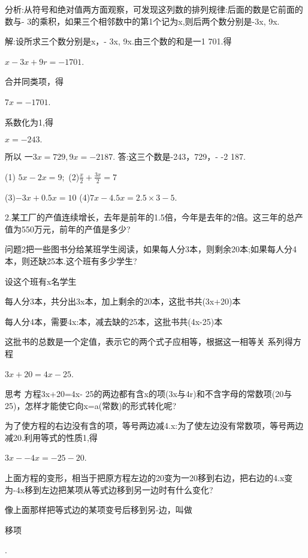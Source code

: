 \documentclass{article}
\begin{document}
\begin{article}
\begin{example}
      分析:从符号和绝对值两方面观察，可发现这列数的排列规律:后面的数是它前面的数与- 3的乘积，如果三个相邻数中的第1个记为x,则后两个数分别是-3x, 9x.      
      
      解:设所求三个数分别是x，- 3x, 9x.由三个数的和是一1 701.得 
      
      $x-3x+9r=-1701$. 
      
      合并同类项，得 
      
      $7x=-1 701$. 
      
      系数化为1,得
      
      $x=-243.$      
      
      所以      
      $一3x=729,9x=-2187$.      
      答:这三个数是-243，729，- -2 187.
      \end{example}
      
      \begin{exercise}
      (1) $5x-2x=9;$  (2)$\frac{x}{2}+\frac{3x}{2}=7$
      
      (3)$-3x+0.5x=10$ (4)$7x-4.5x=2.5\times3-5$.
      
      2.某工厂的产值连续增长，去年是前年的1.5倍，今年是去年的2倍。这三年的总产值为550万元，前年的产值是多少?
      \end{exercise}
      
      \begin{example}
      问题2把一些图书分给某班学生阅读，如果每人分3本，则剩余20本;如果每人分4本，则还缺25本.这个班有多少学生?
      
      设这个班有x名学生
      
      每人分3本，共分出3x本，加上剩余的20本，这批书共(3x+20)本
      
      每人分4本，需要4x:本，减去缺的25本，这批书共(4x-25)本
      
      这批书的总数是一个定值，表示它的两个式子应相等，根据这一相等关 系列得方程
      
      $3x+20=4x-25$.
     
     思考
     方程3x+20=4x- 25的两边都有含x的项(3x与4r)和不含字母的常数项(20与25)，怎样才能使它向x=a(常数)的形式转化呢?
     
     为了使方程的右边没有含的项，等号两边减4.x:为了使左边没有常数项，等号两边减20.利用等式的性质1,得
     
     $3x--4x=-25-20$.
     
     上面方程的变形，相当于把原方程左边的20变为一20移到右边，把右边的4.x变为-4x移到左边把某项从等式边移到另一边时有什么变化?
     
     像上面那样把等式边的某项变号后移到另-边，叫做\begin{defination}移项\end{defination}.
    \end{example}
    

\end{article}
\end{document}
